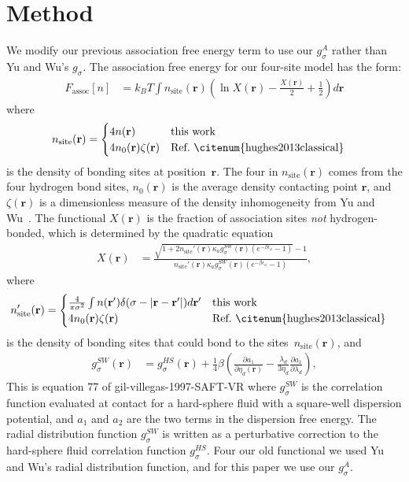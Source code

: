 \documentclass[twocolumn,amsmath,amssymb,prl]{revtex4-1}
\newcommand{\rr}{\textbf{r}}
\newcommand{\xx}{\textbf{r}}
\newcommand\etadisp{\ensuremath{\eta_\textit{d}}}
\newcommand\epsilonassoc{\ensuremath{\epsilon_\textit{a}}}
\newcommand\kappaassoc{\ensuremath{\kappa_\textit{a}}}
\newcommand\lambdadisp{\ensuremath{\lambda_\textit{d}}}
\begin{document}
\section{Method}

We modify our previous association free energy term to use our
$g_{\sigma}^\textit{A}$ rather than Yu and Wu's $g_\sigma$.  The
association free energy for our four-site model has the form:
\begin{align}
  F_\text{assoc}[n] &= k_BT \int n_\text{site}(\xx)
  \left(\ln X(\xx) - \frac{X(\xx)}{2} + \frac12\right) d\xx
\end{align}
where
\begin{align}
  n_\text{site}(\rr) &=
  \begin{cases}
    4 n(\rr) & \text{this work}\\
    4 n_0(\rr) \zeta(\rr) & \text{Ref.~\citenum{hughes2013classical}}
  \end{cases} 
\end{align}
is the density of bonding sites at position~$\rr$.  The four in
$n_\text{site}(\rr)$ comes from the four hydrogen bond sites,
$n_0(\rr)$ is the average density contacting point $\rr$, and
$\zeta(\xx)$ is a dimensionless measure of the density inhomogeneity
from Yu and Wu~\cite{yu2002fmt-dft-inhomogeneous-associating}.  The
functional $X(\rr)$ is the fraction of association sites \emph{not}
hydrogen-bonded, which is determined by the quadratic equation
\begin{align}
  X(\xx) &= \frac{\sqrt{1 + 2n_\text{site}'(\rr)
      \kappaassoc g^\textit{SW}_\sigma(\xx)
  \left(e^{-\beta\epsilonassoc} - 1\right)} - 1}
  {n_\text{site}'(\rr)
    \kappaassoc g^\textit{SW}_\sigma(\xx)
  \left(e^{-\beta\epsilonassoc} - 1\right)}, \label{eq:X}
\end{align}
where
\begin{align}
  n_\text{site}'(\rr) &=
  \begin{cases}
    \frac{4}{\pi\sigma^2} \int n(\rr')\delta(\sigma - |\rr-\rr'|) d\rr' & \text{this work}\\
    4 n_0(\rr) \zeta(\rr) & \text{Ref.~\citenum{hughes2013classical}}
  \end{cases} 
\end{align}
is the density of bonding sites that could bond to the sites~$n_\text{site}(\rr)$, and
\begin{align}
  g^\textit{SW}_\sigma(\xx) &= g^\textit{HS}_\sigma(\xx) +
  \frac{1}{4}\beta\left(\frac{\partial a_1}{\partial \etadisp(\xx)} -
  \frac{\lambdadisp}{3 \etadisp}\frac{\partial a_1}{\partial \lambdadisp}\right)\label{eq:gSW},
\end{align}
This is equation 77 of gil-villegas-1997-SAFT-VR
where $g^\textit{SW}_\sigma$ is the correlation function evaluated at
contact for a hard-sphere fluid with a square-well dispersion
potential, and $a_1$ and $a_2$ are the two terms in the dispersion
free energy.  The radial distribution function $g^\textit{SW}_\sigma$ is
written as a perturbative correction to the hard-sphere fluid
correlation function $g^\textit{HS}_\sigma$. Four our old functional
we used Yu and Wu's radial distribution function, and for this paper we
use our $g^\textit{A}_\sigma$.
\end{document}

